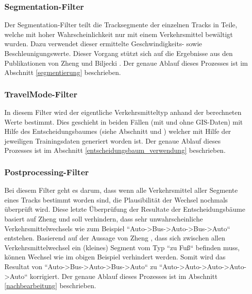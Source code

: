 
\subsubsection{Segmentation-Filter}
Der Segmentation-Filter teilt die Tracksegmente der einzelnen Tracks in Teile, welche mit hoher Wahrscheinlichkeit nur mit einem Verkehrsmittel bewältigt wurden. Dazu verwendet dieser ermittelte Geschwindigkeits- sowie Beschleunigungswerte. Dieser Vorgang stützt sich auf die Ergebnisse aus den Publikationen von Zheng \cite{zheng_understanding_2010} und Biljecki \cite{biljecki_transportation_2013}. Der genaue Ablauf dieses Prozesses ist im Abschnitt \ref{segmentierung}  beschrieben.

\subsubsection{TravelMode-Filter}
In diesem Filter wird der eigentliche Verkehrsmitteltyp anhand der berechneten Werte bestimmt. Dies geschieht in beiden Fällen (mit und ohne GIS-Daten) mit Hilfe des Entscheidungsbaumes (siehe Abschnitt  und ) welcher mit Hilfe der jeweiligen Trainingsdaten generiert worden ist. Der genaue Ablauf dieses Prozesses ist im Abschnitt \ref{entscheidungsbaum_verwendung}  beschrieben.

\subsubsection{Postprocessing-Filter}
Bei diesem Filter geht es darum, dass wenn alle Verkehrsmittel aller Segmente eines Tracks bestimmt worden sind, die Plausibilität der Wechsel nochmals überprüft wird. Diese letzte Überprüfung der Resultate der Entscheidungsbäume basiert auf Zheng \cite{zheng_understanding_2010} und soll verhindern, dass sehr unwahrscheinliche Verkehrsmittelwechsels wie zum Beispiel ``Auto->Bus->Auto->Bus->Auto`` entstehen. Basierend auf der Aussage von Zheng \cite{zheng_understanding_2010}, dass sich zwischen allen Verkehrsmittelwechsel ein (kleines) Segment vom Typ ``zu Fuß`` befinden muss, können Wechsel wie im obigen Beispiel verhindert werden. Somit wird das Resultat von ``Auto->Bus->Auto->Bus->Auto`` zu ``Auto->Auto->Auto->Auto->Auto`` korrigiert. Der genaue Ablauf dieses Prozesses ist im Abschnitt \ref{nachbearbeitung}  beschrieben.

